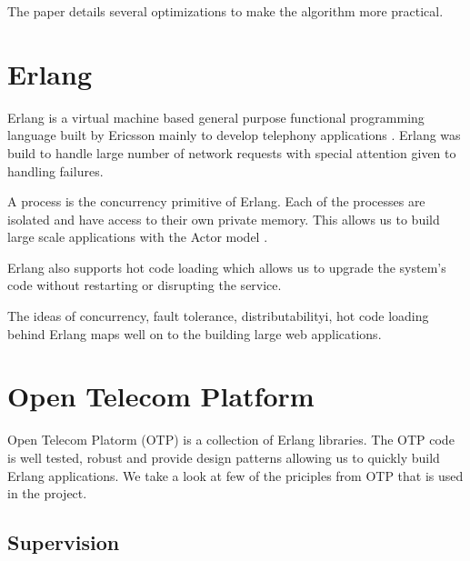 The paper details several optimizations to make the algorithm more practical.

\section{Erlang}

Erlang \citep{erlang} is a virtual machine based general purpose functional 
programming language built by Ericsson mainly to develop telephony applications 
\citep{Armstrong07}. Erlang was build to handle large number of network
requests with special attention given to handling failures.

A process is the concurrency primitive of Erlang. Each of the processes are 
isolated and have access to their own private memory. This allows us to build
large scale applications with the Actor model%
\citep{Clinger81}.

Erlang also supports hot code loading which allows us to upgrade the system's
code without restarting or disrupting the service.

The ideas of concurrency, fault tolerance, distributabilityi, hot code loading
behind Erlang maps well on to the building large web applications.



\section{Open Telecom Platform}
\label{section:concepts.otp}

Open Telecom Platorm (OTP) is a collection of Erlang libraries. The OTP code is
well tested, robust and provide design patterns allowing us to quickly build 
Erlang applications. We take a look at few of the priciples from OTP that is
used in the project.

\subsection{Supervision}
\label{section:concepts.supervision}

